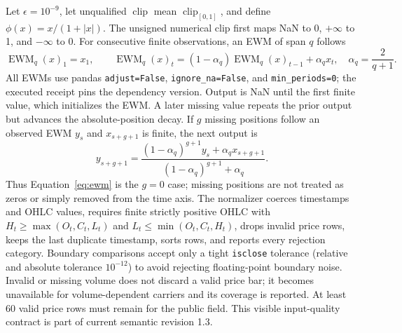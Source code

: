 \documentclass{article}
\newcommand{\clip}{\operatorname{clip}}
\newcommand{\EWM}{\operatorname{EWM}}
\begin{document}
Let $\epsilon=10^{-9}$, let unqualified $\clip$ mean $\clip_{[0,1]}$, and define $\phi(x)=x/(1+|x|)$. The unsigned numerical clip first maps NaN to 0, $+\infty$ to 1, and $-\infty$ to 0. For consecutive finite observations, an EWM of span $q$ follows
\begin{equation}
\EWM_q(x)_1=x_1,\qquad
\EWM_q(x)_t=(1-\alpha_q)\EWM_q(x)_{t-1}+\alpha_qx_t,
\quad \alpha_q=\frac{2}{q+1}.
\label{eq:ewm}
\end{equation}
All EWMs use pandas \texttt{adjust=False}, \texttt{ignore\_na=False}, and \texttt{min\_periods=0}; the executed receipt pins the dependency version. Output is NaN until the first finite value, which initializes the EWM. A later missing value repeats the prior output but advances the absolute-position decay. If $g$ missing positions follow an observed EWM $y_s$ and $x_{s+g+1}$ is finite, the next output is
\begin{equation}
y_{s+g+1}=\frac{(1-\alpha_q)^{g+1}y_s+\alpha_qx_{s+g+1}}
{(1-\alpha_q)^{g+1}+\alpha_q}.
\end{equation}
Thus Equation~\ref{eq:ewm} is the $g=0$ case; missing positions are not treated as zeros or simply removed from the time axis.
The normalizer coerces timestamps and OHLC values, requires finite strictly positive OHLC with $H_t\ge\max(O_t,C_t,L_t)$ and $L_t\le\min(O_t,C_t,H_t)$, drops invalid price rows, keeps the last duplicate timestamp, sorts rows, and reports every rejection category. Boundary comparisons accept only a tight \texttt{isclose} tolerance (relative and absolute tolerance $10^{-12}$) to avoid rejecting floating-point boundary noise. Invalid or missing volume does not discard a valid price bar; it becomes unavailable for volume-dependent carriers and its coverage is reported. At least 60 valid price rows must remain for the public field. This visible input-quality contract is part of current semantic revision 1.3.
\end{document}

